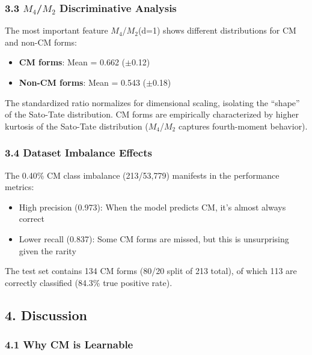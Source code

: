 \documentclass[
]{article}
\providecommand{\tightlist}{%
  \setlength{\itemsep}{0pt}\setlength{\parskip}{0pt}}
\begin{document}
\hypertarget{mux2084mux2082-discriminative-analysis}{%
\subsubsection{3.3 $M_4$/$M_2$ Discriminative
Analysis}\label{mux2084mux2082-discriminative-analysis}}

The most important feature $M_4$/$M_2$(d=1) shows different distributions for
CM and non-CM forms:

\begin{itemize}
\tightlist
\item
  \textbf{CM forms}: Mean = 0.662 ($\pm$0.12)
\item
  \textbf{Non-CM forms}: Mean = 0.543 ($\pm$0.18)
\end{itemize}

The standardized ratio normalizes for dimensional scaling, isolating the
``shape'' of the Sato-Tate distribution. CM forms are empirically
characterized by higher kurtosis of the Sato-Tate distribution ($M_4$/$M_2$
captures fourth-moment behavior).

\hypertarget{dataset-imbalance-effects}{%
\subsubsection{3.4 Dataset Imbalance
Effects}\label{dataset-imbalance-effects}}

The 0.40\% CM class imbalance (213/53,779) manifests in the performance
metrics:

\begin{itemize}
\tightlist
\item
  High precision (0.973): When the model predicts CM, it's almost always
  correct
\item
  Lower recall (0.837): Some CM forms are missed, but this is
  unsurprising given the rarity
\end{itemize}

The test set contains 134 CM forms (80/20 split of 213 total), of which
113 are correctly classified (84.3\% true positive rate).

\hypertarget{discussion}{%
\subsection{4. Discussion}\label{discussion}}

\hypertarget{why-cm-is-learnable}{%
\subsubsection{4.1 Why CM is Learnable}\label{why-cm-is-learnable}}
\end{document}

